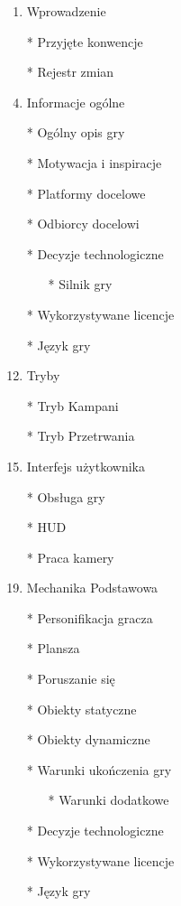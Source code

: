 \documentclass{article}
\begin{document}
\newpage
{}
\begin{enumerate}
	\item Wprowadzenie
	    \item[*] Przyjęte konwencje
	    \item[*] Rejestr zmian
	\item Informacje ogólne
	    \item[*] Ogólny opis gry
	    \item[*] Motywacja i inspiracje
	    \item[*] Platformy docelowe
	    \item[*] Odbiorcy docelowi
	    \item[*] Decyzje technologiczne
	       \begin{enumerate}
	    \item[*] Silnik gry
	    \end{enumerate}
	    \item[*] Wykorzystywane licencje
	    \item[*] Język gry
	\item Tryby
	    \item[*] Tryb Kampani
	    \item[*] Tryb Przetrwania
    \item Interfejs użytkownika
        \item[*] Obsługa gry
	    \item[*] HUD
	    \item[*] Praca kamery
	    
	\item Mechanika Podstawowa
	    \item[*] Personifikacja gracza
	    \item[*] Plansza
	    \item[*] Poruszanie się
	    \item[*] Obiekty statyczne 
	    
	    \item[*] Obiekty dynamiczne 
	    
	    \item[*] Warunki ukończenia gry 
	    \begin{enumerate}
	    \item[*] Warunki dodatkowe
	    \end{enumerate}
	    
	    \item[*] Decyzje technologiczne
	    \item[*] Wykorzystywane licencje
	    \item[*] Język gry
	    

\end{enumerate}
\end{document}
